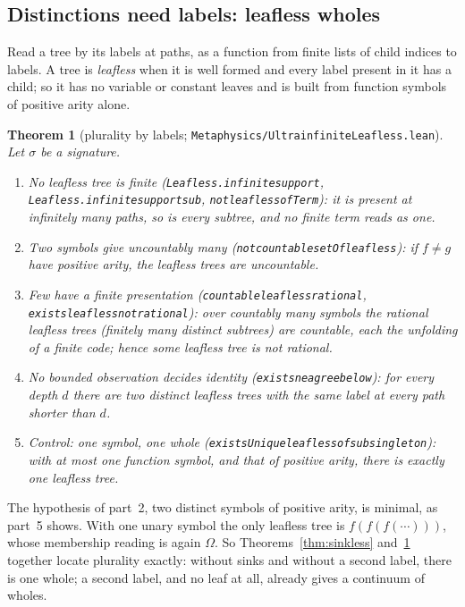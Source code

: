 \documentclass[]{article}
\newtheorem{theorem}{Theorem}
\theoremstyle{definition}
\theoremstyle{remark}
\newcommand{\codeus}{\textunderscore\allowbreak}
\newcommand{\code}[1]{\texttt{\let\_\codeus #1}}
\newcommand{\lpath}[1]{{\ttfamily\nolinkurl{#1}}}
\newcommand{\Om}{\Omega}
\newcommand{\meta}[1]{\lpath{Metaphysics/#1.lean}}
\begin{document}
\subsection{Distinctions need labels: leafless wholes}
\label{sec:leafless}

Read a tree by its labels at paths, as a function from finite lists of child indices to labels. A
tree is \emph{leafless} when it is well formed and every label present in it has a child; so it has
no variable or constant leaves and is built from function symbols of positive arity alone.

\begin{theorem}[plurality by labels; \meta{UltrainfiniteLeafless}]
\label{thm:leafless}
Let $\sigma$ be a signature.
\begin{enumerate}
\item \emph{No leafless tree is finite} (\code{Leafless.infinite\_support},
  \code{Leafless.infinite\_support\_sub}, \code{not\_leafless\_ofTerm}): it is present at infinitely
  many paths, so is every subtree, and no finite term reads as one.
\item \emph{Two symbols give uncountably many} (\code{not\_countable\_setOf\_leafless}): if $f\neq g$
  have positive arity, the leafless trees are uncountable.
\item \emph{Few have a finite presentation} (\code{countable\_leafless\_rational},
  \code{exists\_leafless\_not\_rational}): over countably many symbols the rational leafless trees
  (finitely many distinct subtrees) are countable, each the unfolding of a finite code; hence some
  leafless tree is not rational.
\item \emph{No bounded observation decides identity} (\code{exists\_ne\_agree\_below}): for every depth
  $d$ there are two distinct leafless trees with the same label at every path shorter than $d$.
\item \emph{Control: one symbol, one whole} (\code{existsUnique\_leafless\_of\_subsingleton}): with at
  most one function symbol, and that of positive arity, there is exactly one leafless tree.
\end{enumerate}
\end{theorem}

The hypothesis of part~2, two distinct symbols of positive arity, is minimal, as part~5 shows.
With one unary symbol the only leafless tree is $f(f(f(\cdots)))$, whose membership reading is again
$\Om$. So Theorems~\ref{thm:sinkless} and~\ref{thm:leafless} together locate plurality exactly:
without sinks and without a second label, there is one whole; a second label, and no leaf at all,
already gives a continuum of wholes.
\end{document}
